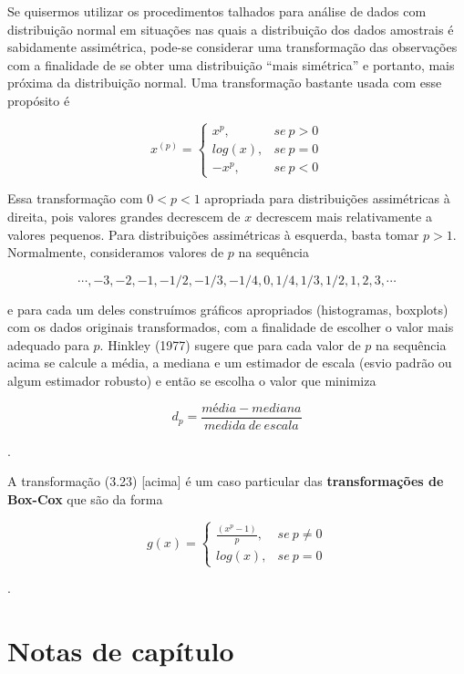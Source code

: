 \documentclass[
]{latex/krantz}
\renewenvironment{quote}{\begin{VF}}{\end{VF}}
\theoremstyle{definition}
\theoremstyle{definition}
\theoremstyle{definition}
\theoremstyle{definition}
\theoremstyle{remark}
\begin{document}
\begin{quote}
Se quisermos utilizar os procedimentos talhados para análise de dados com distribuição normal em situações nas quais a distribuição dos dados amostrais é sabidamente assimétrica, pode-se considerar uma transformação das observações com a finalidade de se obter uma distribuição ``mais simétrica'' e portanto, mais próxima da distribuição normal. Uma transformação bastante usada com esse propósito é

\[
x^{(p)} =
\begin{cases}
x^{p}, & se \ p > 0 \\
log(x), & se \ p = 0 \\
-x^{p}, & se \ p < 0
\end{cases}
\]

Essa transformação com \(0 < p < 1\) apropriada para distribuições assimétricas à direita, pois valores grandes decrescem de \(x\) decrescem mais relativamente a valores pequenos. Para distribuições assimétricas à esquerda, basta tomar \(p > 1\). Normalmente, consideramos valores de \(p\) na sequência

\[\cdots, -3, -2, -1, -1/2, -1/3, -1/4, 0, 1/4, 1/3, 1/2, 1, 2, 3, \cdots\]

e para cada um deles construímos gráficos apropriados (histogramas, boxplots) com os dados originais transformados, com a finalidade de escolher o valor mais adequado para \(p\). Hinkley (1977) sugere que para cada valor de \(p\) na sequência acima se calcule a média, a mediana e um estimador de escala (esvio padrão ou algum estimador robusto) e então se escolha o valor que minimiza

\[d_{p} = \frac{média - mediana}{medida \ de \ escala}\]

\citep[p.~67]{MorettinSinger2022}.
\end{quote}

\begin{quote}
A transformação (3.23) {[}acima{]} é um caso particular das \textbf{transformações de Box-Cox} que são da forma

\[
g(x) = 
\begin{cases}
\frac{(x^{p} - 1)}{p}, & se \ p \neq 0 \\
log(x), & se \ p = 0
\end{cases}
\]

\citep[p.~69]{MorettinSinger2022}.
\end{quote}

\hypertarget{notas-de-capuxedtulo-1}{%
\section{Notas de capítulo}\label{notas-de-capuxedtulo-1}}
\end{document}
